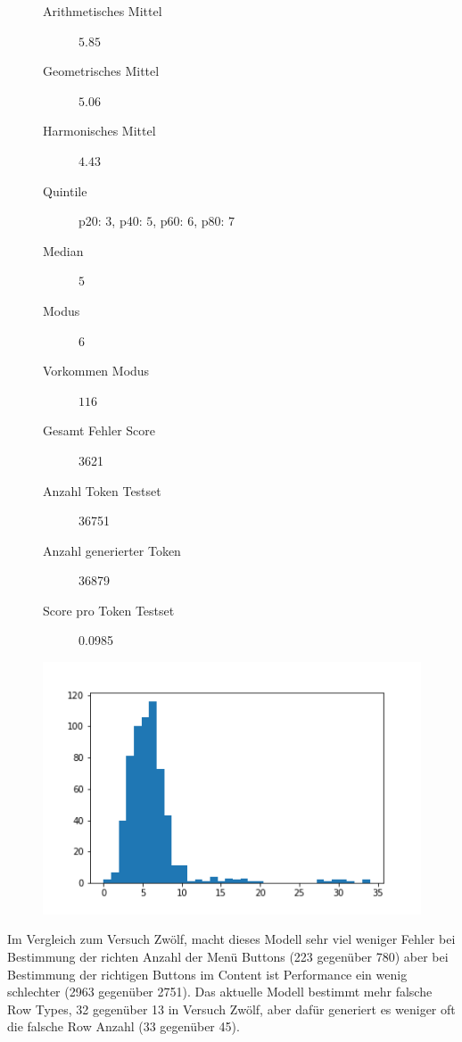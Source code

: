 \documentclass[pdftex,a4paper,halfparskip, article]{scrartcl}
\begin{document}
\begin{figure}
\centering
\begin{minipage}{.5\textwidth}
  \centering
  \begin{description}
	\item[Arithmetisches Mittel] $5.85$	
	\item[Geometrisches Mittel] $5.06$
	\item[Harmonisches Mittel] $4.43$
	\item[Quintile] p20: $3$, p40: $5$, p60: $6$, p80: $7$
	\item[Median] $5$
	\item[Modus] $6$
	\item[Vorkommen Modus] $116$
	\item[Gesamt Fehler Score] 3621
	\item[Anzahl Token Testset] 36751 
	\item[Anzahl generierter Token] 36879
	\item[Score pro Token Testset]  0.0985
\end{description}
  \label{fig:lage_bin16}
\end{minipage}%
\begin{minipage}{.5\textwidth}
  \centering
  \includegraphics[width=1\linewidth]{predictions_bin18_2_histogramm}
  \label{fig:hist_bin18}
\end{minipage}
\end{figure}

Im Vergleich zum Versuch Zwölf, macht dieses Modell sehr viel weniger Fehler bei Bestimmung der richten Anzahl der Menü Buttons (223 gegenüber 780) aber bei Bestimmung der richtigen Buttons im Content ist Performance ein wenig schlechter (2963 gegenüber 2751). Das aktuelle Modell bestimmt mehr falsche Row Types, 32 gegenüber 13 in Versuch Zwölf, aber dafür generiert es weniger oft die falsche Row Anzahl (33 gegenüber 45). 
\end{document}
